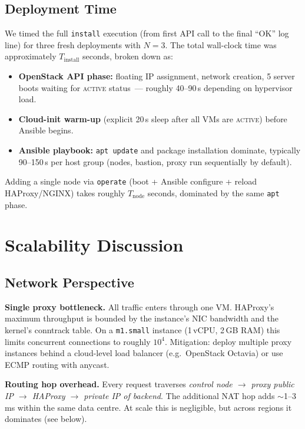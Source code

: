 \documentclass[conference]{IEEEtran}
\begin{document}
\subsection{Deployment Time}

We timed the full \texttt{install} execution (from first API call to
the final ``OK'' log line) for three fresh deployments with $N=3$.
The total wall-clock time was approximately $T_{\text{install}}$
seconds, broken down as:

\begin{itemize}
  \item \textbf{OpenStack API phase:} floating IP assignment, network
        creation, 5 server boots waiting for \textsc{active}
        status~--- roughly 40--90\,s depending on hypervisor load.
  \item \textbf{Cloud-init warm-up} (explicit 20\,s sleep after all
        VMs are \textsc{active}) before Ansible begins.
  \item \textbf{Ansible playbook:} \texttt{apt update} and package
        installation dominate, typically 90--150\,s per host group
        (nodes, bastion, proxy run sequentially by default).
\end{itemize}

Adding a single node via \texttt{operate} (boot + Ansible configure +
reload HAProxy/NGINX) takes roughly $T_{\text{node}}$ seconds,
dominated by the same \texttt{apt} phase.

\section{Scalability Discussion}
\label{sec:scale}

\subsection{Network Perspective}

\textbf{Single proxy bottleneck.}
All traffic enters through one VM.  HAProxy's maximum throughput is
bounded by the instance's NIC bandwidth and the kernel's conntrack
table.  On a \texttt{m1.small} instance (1\,vCPU, 2\,GB RAM) this
limits concurrent connections to roughly $10^4$.  Mitigation: deploy
multiple proxy instances behind a cloud-level load balancer (e.g.\
OpenStack Octavia) or use ECMP routing with anycast.

\textbf{Routing hop overhead.}
Every request traverses \emph{control node $\to$ proxy public IP $\to$
HAProxy $\to$ private IP of backend}.  The additional NAT hop adds
$\sim$1--3\,ms within the same data centre.  At scale this is
negligible, but across regions it dominates (see below).
\end{document}
